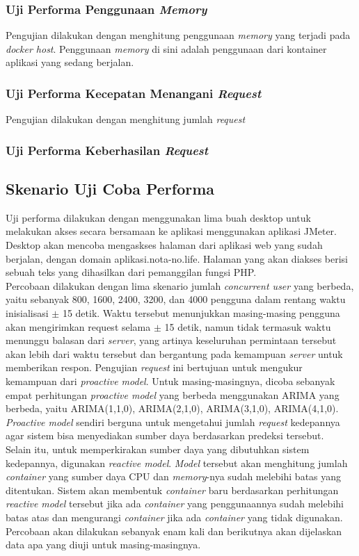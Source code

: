 \subsubsection{Uji Performa Penggunaan \textit{Memory}}
Pengujian dilakukan dengan menghitung penggunaan \textit{memory} yang terjadi pada \textit{docker host}. Penggunaan \textit{memory} di sini adalah penggunaan dari kontainer aplikasi yang sedang berjalan.

\subsubsection{Uji Performa Kecepatan Menangani \textit{Request}}
Pengujian dilakukan dengan menghitung jumlah \textit{request}

\subsubsection{Uji Performa Keberhasilan \textit{Request}}
        
    \subsection{Skenario Uji Coba Performa}
    	Uji performa dilakukan dengan menggunakan lima buah desktop untuk melakukan akses secara bersamaan ke aplikasi menggunakan aplikasi JMeter. Desktop akan mencoba mengaskses halaman dari aplikasi web yang sudah berjalan, dengan domain aplikasi.nota-no.life. Halaman yang akan diakses berisi sebuah teks yang dihasilkan dari pemanggilan fungsi PHP. \\
        \indent Percobaan dilakukan dengan lima skenario jumlah \textit{concurrent user} yang berbeda, yaitu sebanyak 800, 1600, 2400, 3200, dan 4000 pengguna dalam rentang waktu inisialisasi $\pm$ 15 detik. Waktu tersebut menunjukkan masing-masing pengguna akan mengirimkan request selama $\pm$ 15 detik, namun tidak termasuk waktu menunggu balasan dari \textit{server}, yang artinya keseluruhan permintaan tersebut akan lebih dari waktu tersebut dan bergantung pada kemampuan \textit{server} untuk memberikan respon. Pengujian \textit{request} ini bertujuan untuk mengukur kemampuan dari \textit{proactive model}. Untuk masing-masingnya, dicoba sebanyak empat perhitungan \textit{proactive model} yang berbeda menggunakan ARIMA yang berbeda, yaitu ARIMA(1,1,0), ARIMA(2,1,0), ARIMA(3,1,0), ARIMA(4,1,0). \textit{Proactive model} sendiri berguna untuk mengetahui jumlah \textit{request} kedepannya agar sistem bisa menyediakan sumber daya berdasarkan predeksi tersebut. \\
        \indent Selain itu, untuk memperkirakan sumber daya yang dibutuhkan sistem kedepannya, digunakan \textit{reactive model}. \textit{Model} tersebut akan menghitung jumlah \textit{container} yang sumber daya CPU dan \textit{memory}-nya sudah melebihi batas yang ditentukan. Sistem akan membentuk \textit{container} baru berdasarkan perhitungan \textit{reactive model} tersebut jika ada \textit{container} yang penggunaannya sudah melebihi batas atas dan mengurangi \textit{container} jika ada \textit{container} yang tidak digunakan. Percobaan akan dilakukan sebanyak enam kali dan berikutnya akan dijelaskan data apa yang diuji untuk masing-masingnya. \\
        \indent
